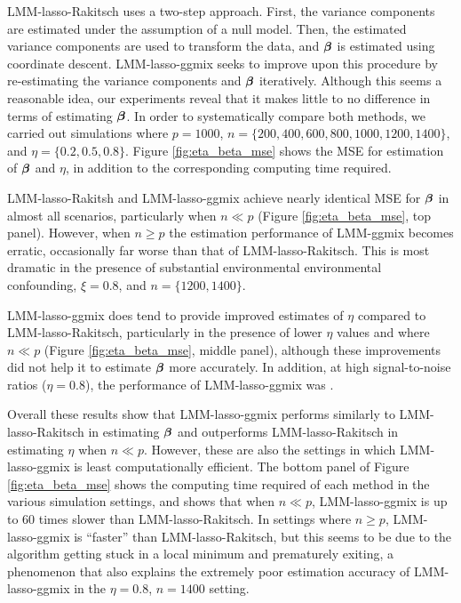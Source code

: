 LMM-lasso-Rakitsch uses a two-step approach. First, the variance components are estimated under the assumption of a null model. Then, the estimated variance components are used to transform the data, and $\boldsymbol{\beta}{}$ is estimated using coordinate descent. LMM-lasso-ggmix seeks to improve upon this procedure by re-estimating the variance components and $\boldsymbol{\beta}{}$ iteratively. Although this seems a reasonable idea, our experiments reveal that it makes little to no difference in terms of estimating $\boldsymbol{\beta}{}$. In order to systematically compare both methods, we carried out simulations where $p = 1000$, $n = \{200, 400, 600, 800, 1000, 1200, 1400\}$, and $\eta = \{0.2, 0.5, 0.8\}$. Figure \ref{fig:eta_beta_mse} shows the MSE for estimation of $\boldsymbol{\beta}{}$ and $\eta$, in addition to the corresponding computing time required. 

LMM-lasso-Rakitsh and LMM-lasso-ggmix achieve nearly identical MSE for $\boldsymbol{\beta}{}$ in almost all scenarios, particularly when $n \ll p$ (Figure \ref{fig:eta_beta_mse}, top panel). However, when $n \ge p$ the estimation performance of LMM-ggmix becomes erratic, occasionally far worse than that of LMM-lasso-Rakitsch. This is most dramatic in the presence of substantial environmental environmental confounding, $\xi = 0.8$, and $n = \{1200, 1400\}$. 

LMM-lasso-ggmix does tend to provide improved estimates of $\eta$ compared to LMM-lasso-Rakitsch, particularly in the presence of lower $\eta$ values and where $n \ll p$ (Figure \ref{fig:eta_beta_mse}, middle panel), although these improvements did not help it to estimate $\boldsymbol{\beta}{}$ more accurately. In addition, at high signal-to-noise ratios ($\eta=0.8$), the performance of LMM-lasso-ggmix was .

Overall these results show that LMM-lasso-ggmix performs similarly to LMM-lasso-Rakitsch in estimating $\boldsymbol{\beta}{}$ and outperforms LMM-lasso-Rakitsch in estimating $\eta$ when $n \ll p$. However, these are also the settings in which LMM-lasso-ggmix is least computationally efficient. The bottom panel of Figure \ref{fig:eta_beta_mse} shows the computing time required of each method in the various simulation settings, and shows that when $n \ll p$, LMM-lasso-ggmix is up to 60 times slower than LMM-lasso-Rakitsch. In settings where $n \ge p$, LMM-lasso-ggmix is ``faster'' than LMM-lasso-Rakitsch, but this seems to be due to the algorithm getting stuck in a local minimum and prematurely exiting, a phenomenon that also explains the extremely poor estimation accuracy of LMM-lasso-ggmix in the $\eta=0.8$, $n=1400$ setting.

